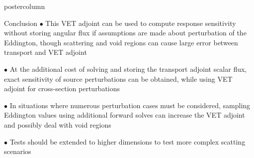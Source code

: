 \documentclass[xcolor={usenames,dvipsnames,svgnames,table}]{beamer}
\begin{document}
\begin{frame}
\begin{columns}
\begin{column}{.33\textwidth}
\begin{beamercolorbox}[center,wd=\textwidth]{postercolumn}
\begin{minipage}[T]{0.95\textwidth}
{\begin{block}{Conclusion}
$\bullet$ This VET adjoint can be used to compute response sensitivity without storing angular flux if assumptions are made about perturbation of the Eddington, though scattering and void regions can cause large error between transport and VET adjoint


$\bullet$ At the additional cost of solving and storing the transport adjoint scalar flux, exact sensitivity of source perturbations can be obtained, while using VET adjoint for cross-section perturbations

$\bullet$ In situations where numerous perturbation cases must be considered, sampling Eddington values using additional forward solves can increase the VET adjoint and possibly deal with void regions

$\bullet$ Tests should be extended to higher dimensions to test more complex scatting scenarios 
			    \end{block}
			    \vfill
			}
			\end{minipage}
		\end{beamercolorbox}
	\end{column}

	\end{columns}
\end{frame}
\end{document}
